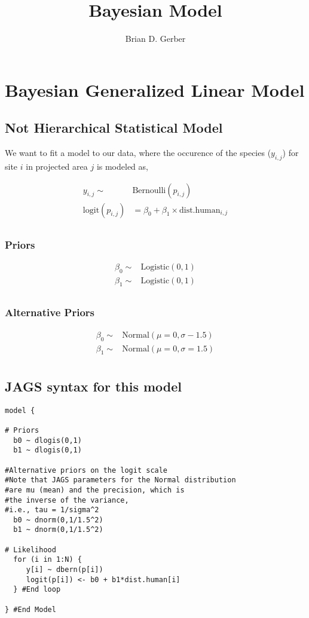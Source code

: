 \documentclass[12pt]{article}
\title{Bayesian  Model}
\author{Brian D. Gerber}
\begin{document}
\maketitle
\section{Bayesian Generalized Linear  Model}
\subsection{Not Hierarchical Statistical Model}

\Large

We want to fit a model to our data, where the occurence of the species ($y_{i,j}$) for site $i$ in projected area $j$ is modeled as,

\begin{align*}
y_{i,j}\sim& \text{Bernoulli}(p_{i,j})\\
\text{logit}(p_{i,j}) &= \beta_{0} + \beta_{1}\times \text{dist.human}_{i,j}\\
\end{align*}

\subsubsection{Priors}

\begin{align*}
\beta_{0} \sim& \text{Logistic}(0, 1)\\
\beta_{1} \sim& \text{Logistic}(0, 1)\\
\end{align*}


\subsubsection{Alternative Priors}


\begin{align*}
\beta_{0} \sim& \text{Normal}(\mu = 0, \sigma-1.5)\\
\beta_{1} \sim& \text{Normal}(\mu= 0, \sigma = 1.5)\\
\end{align*}


\pagebreak

\subsection{JAGS syntax for this model}

\begin{verbatim}
model {

# Priors
  b0 ~ dlogis(0,1)
  b1 ~ dlogis(0,1)

#Alternative priors on the logit scale
#Note that JAGS parameters for the Normal distribution
#are mu (mean) and the precision, which is 
#the inverse of the variance,
#i.e., tau = 1/sigma^2
  b0 ~ dnorm(0,1/1.5^2)
  b1 ~ dnorm(0,1/1.5^2)

# Likelihood
  for (i in 1:N) {
     y[i] ~ dbern(p[i])
     logit(p[i]) <- b0 + b1*dist.human[i]
  } #End loop
  
} #End Model
\end{verbatim}
\end{document}
